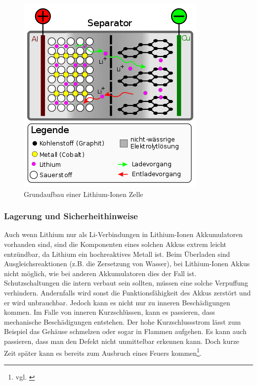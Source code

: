 \begin{figure}[H]
	\begin{center}
		\includegraphics[scale=0.5]{figures/Akku/350px-Li-Ion-Zelle_(CoO2-Carbon,_Schema).svg.png}
		\caption{Grundaufbau einer Lithium-Ionen Zelle \cite{GrundaufbauLiionenZelle}}
		\label{fig:Grundaufbau einer Lithium-Ionen Zelle}
	\end{center}
\end{figure}
\newpage

\subsubsection{Lagerung und Sicherheithinweise}
Auch wenn Lithium nur als Li-Verbindungen in Lithium-Ionen Akkumulatoren vorhanden sind, sind die Komponenten eines solchen Akkus extrem leicht entzündbar, da Lithium ein hochreaktives Metall ist. Beim Überladen sind Ausgleichsreaktionen (z.B. die Zersetzung von Wasser), bei Lithium-Ionen Akkus nicht möglich, wie bei anderen Akkumulatoren dies der Fall ist. Schutzschaltungen die intern verbaut sein sollten, müssen eine solche Verpuffung verhindern. Andernfalls wird sonst die Funktionsfähigkeit des Akkus zerstört und er wird unbrauchbar. 
Jedoch kann es nicht nur zu inneren Beschädigungen kommen. Im Falle von inneren Kurzschlüssen, kann es passieren, dass mechanische Beschädigungen entstehen. Der hohe Kurzschlussstrom lässt zum Beispiel das Gehäuse schmelzen oder sogar in Flammen aufgehen. Es kann auch passieren, dass man den Defekt nicht unmittelbar erkennen kann. Doch kurze Zeit später kann es bereits zum Ausbruch eines Feuers kommen\footnote{vgl. \cite{LithiumIonenAkkumulatorLagerung}}.

